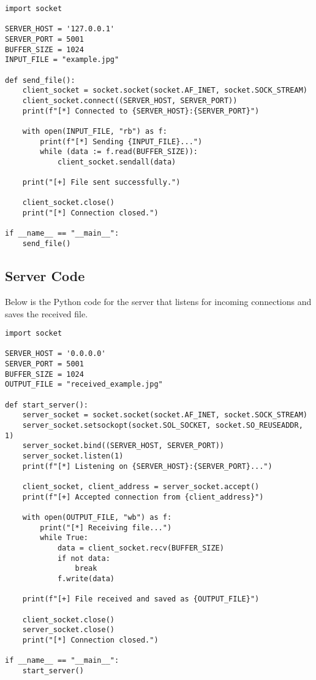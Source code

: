 \documentclass{article}
\begin{document}
\begin{verbatim}
import socket

SERVER_HOST = '127.0.0.1'  
SERVER_PORT = 5001       
BUFFER_SIZE = 1024        
INPUT_FILE = "example.jpg" 

def send_file():
    client_socket = socket.socket(socket.AF_INET, socket.SOCK_STREAM)
    client_socket.connect((SERVER_HOST, SERVER_PORT))
    print(f"[*] Connected to {SERVER_HOST}:{SERVER_PORT}")

    with open(INPUT_FILE, "rb") as f:
        print(f"[*] Sending {INPUT_FILE}...")
        while (data := f.read(BUFFER_SIZE)):
            client_socket.sendall(data)

    print("[+] File sent successfully.")
    
    client_socket.close()
    print("[*] Connection closed.")

if __name__ == "__main__":
    send_file()

\end{verbatim}

\clearpage
\subsection{Server Code}
Below is the Python code for the server that listens for incoming connections and saves the received file.

\begin{verbatim}
import socket

SERVER_HOST = '0.0.0.0' 
SERVER_PORT = 5001       
BUFFER_SIZE = 1024       
OUTPUT_FILE = "received_example.jpg"  

def start_server():
    server_socket = socket.socket(socket.AF_INET, socket.SOCK_STREAM)
    server_socket.setsockopt(socket.SOL_SOCKET, socket.SO_REUSEADDR, 1)
    server_socket.bind((SERVER_HOST, SERVER_PORT))
    server_socket.listen(1)
    print(f"[*] Listening on {SERVER_HOST}:{SERVER_PORT}...")

    client_socket, client_address = server_socket.accept()
    print(f"[+] Accepted connection from {client_address}")

    with open(OUTPUT_FILE, "wb") as f:
        print("[*] Receiving file...")
        while True:
            data = client_socket.recv(BUFFER_SIZE)
            if not data:
                break
            f.write(data)

    print(f"[+] File received and saved as {OUTPUT_FILE}")

    client_socket.close()
    server_socket.close()
    print("[*] Connection closed.")

if __name__ == "__main__":
    start_server()
\end{verbatim}
\end{document}
